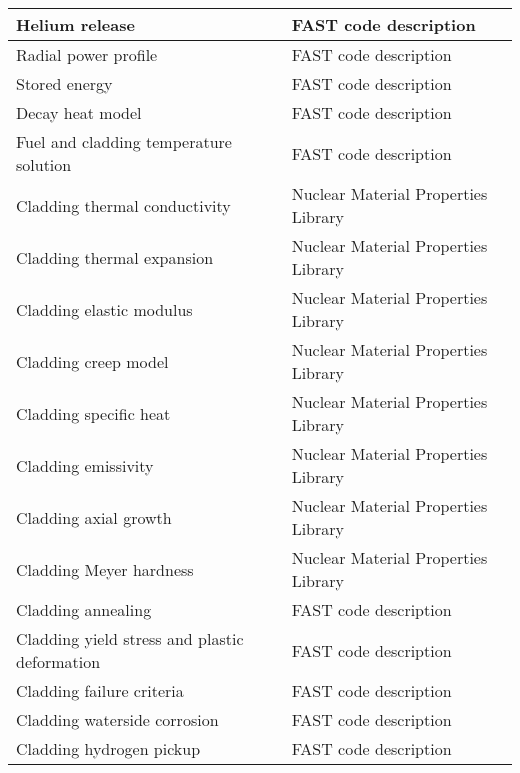 \begin{longtable}{|m{8.0cm} | m{7.0cm}|}
            Helium release 								            &					 FAST code description		                        \\\hline
            Radial power profile 							        &					 FAST code description                              \\\hline
            Stored energy 									        &					 FAST code description		                        \\\hline
            Decay heat model 								        &					 FAST code description	                            \\\hline
            Fuel and cladding temperature solution 			        &					 FAST code description			                    \\\hline
            Cladding thermal conductivity 					        &					 Nuclear Material Properties Library			    \\\hline
            Cladding thermal expansion       				        &					 Nuclear Material Properties Library			    \\\hline
            Cladding elastic modulus 						        &					 Nuclear Material Properties Library		        \\\hline
            Cladding creep model 							        &					 Nuclear Material Properties Library			    \\\hline
            Cladding specific heat 							        &					 Nuclear Material Properties Library			    \\\hline
            Cladding emissivity 							        &					 Nuclear Material Properties Library			    \\\hline
            Cladding axial growth 							        &					 Nuclear Material Properties Library			    \\\hline
            Cladding Meyer hardness 						        &					 Nuclear Material Properties Library			    \\\hline
            Cladding annealing 								        &					 FAST code description			                    \\\hline
            Cladding yield stress and plastic deformation 	        &					 FAST code description			                    \\\hline
            Cladding failure criteria 						        &					 FAST code description		                        \\\hline
            Cladding waterside corrosion 					        &					 FAST code description	                           	\\\hline
            Cladding hydrogen pickup 						        &					 FAST code description		                        \\\hline

\end{longtable}
